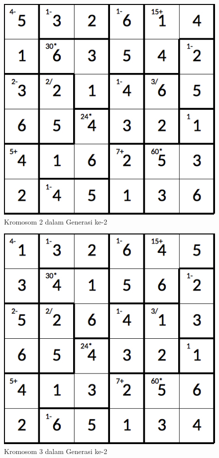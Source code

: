 \begin{figure}
\centering
\captionsetup{justification=centering}
\includegraphics[scale=0.333]{Gambar/hybridgenetic/Generation2Chromosome2}
\caption[Kromosom 2 dalam Generasi ke-2]{Kromosom 2 dalam Generasi ke-2}
\label{fig:analisisg2k2}
\end{figure}

\begin{figure}
\centering
\captionsetup{justification=centering}
\includegraphics[scale=0.333]{Gambar/hybridgenetic/Generation2Chromosome3}
\caption[Kromosom 3 dalam Generasi ke-2]{Kromosom 3 dalam Generasi ke-2}
\label{fig:analisisg2k3}
\end{figure}

